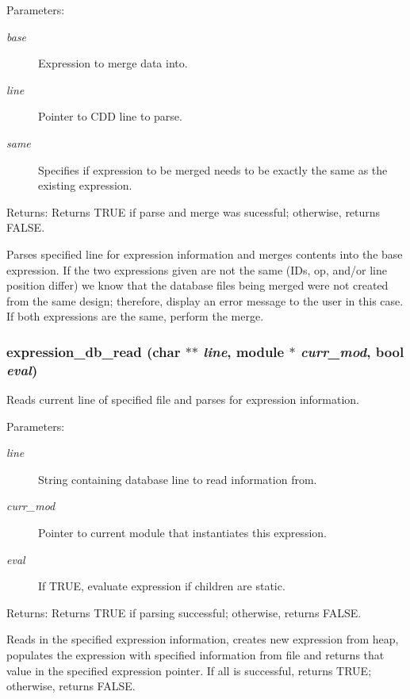 \begin{Desc}
\item[Parameters:]
\begin{description}
\item[{\em base}]Expression to merge data into. \item[{\em line}]Pointer to CDD line to parse. \item[{\em same}]Specifies if expression to be merged needs to be exactly the same as the existing expression.\end{description}
\end{Desc}
\begin{Desc}
\item[Returns:]Returns TRUE if parse and merge was sucessful; otherwise, returns FALSE.\end{Desc}
Parses specified line for expression information and merges contents into the base expression. If the two expressions given are not the same (IDs, op, and/or line position differ) we know that the database files being merged were not created from the same design; therefore, display an error message to the user in this case. If both expressions are the same, perform the merge. 
\subsubsection{ expression\_\-db\_\-read (char $\ast$$\ast$ {\em line}, {\bf module} $\ast$ {\em curr\_\-mod}, {\bf bool} {\em eval})}\label{expr_8h_a7}


Reads current line of specified file and parses for expression information. 

\begin{Desc}
\item[Parameters:]
\begin{description}
\item[{\em line}]String containing database line to read information from. \item[{\em curr\_\-mod}]Pointer to current module that instantiates this expression. \item[{\em eval}]If TRUE, evaluate expression if children are static.\end{description}
\end{Desc}
\begin{Desc}
\item[Returns:]Returns TRUE if parsing successful; otherwise, returns FALSE.\end{Desc}
Reads in the specified expression information, creates new expression from heap, populates the expression with specified information from file and returns that value in the specified expression pointer. If all is successful, returns TRUE; otherwise, returns FALSE. 
